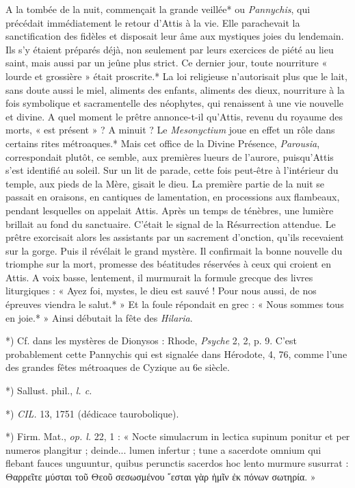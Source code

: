 \documentclass[a4paper, 11pt, oneside, polutonikogreek, french]{article}
\begin{document}
A la tombée de la nuit, commençait la grande veillée* ou \emph{Pannychis}, qui précédait immédiatement le retour d'Attis à la vie. Elle parachevait la sanctification des fidèles et disposait leur âme aux mystiques joies du lendemain. Ils s'y étaient préparés déjà, non seulement par leurs exercices de piété au lieu saint, mais aussi par un jeûne plus strict. Ce dernier jour, toute nourriture « lourde et grossière » était proscrite.* La loi religieuse n'autorisait plus que le lait, sans doute aussi le miel, aliments des enfants, aliments des dieux, nourriture à la fois symbolique et sacramentelle des néophytes, qui renaissent à une vie nouvelle et divine. A quel moment le prêtre annonce-t-il qu'Attis, revenu du royaume des morts, « est présent » ? A minuit ? Le \emph{Mesonyctium} joue en effet un rôle dans certains rites métroaques.* Mais cet office de la Divine Présence, \emph{Parousia}, correspondait plutôt, ce semble, aux premières lueurs de l'aurore, puisqu'Attis s'est identifié au soleil. Sur un lit de parade, cette fois peut-être à l'intérieur du temple, aux pieds de la Mère, gisait le dieu. La première partie de la nuit se passait en oraisons, en cantiques de lamentation, en processions aux flambeaux, pendant lesquelles on appelait Attis. Après un temps de ténèbres, une lumière brillait au fond du sanctuaire. C'était le signal de la Résurrection attendue. Le prêtre exorcisait alors les assistants par un sacrement d'onction, qu'ils recevaient sur la gorge. Puis il révélait le grand mystère. Il confirmait la bonne nouvelle du triomphe sur la mort, promesse des béatitudes réservées à ceux qui croient en Attis. A voix basse, lentement, il murmurait la formule grecque des livres liturgiques : « Ayez foi, mystes, le dieu est sauvé ! Pour nous aussi, de nos épreuves viendra le salut.* » Et la foule répondait en grec : « Nous sommes tous en joie.* » Ainsi débutait la fête des \emph{Hilaria}.

*) Cf. dans les mystères de Dionysos : Rhode, \emph{Psyche} 2, 2, p. 9. C'est probablement cette Pannychis qui est signalée dans Hérodote, 4, 76, comme l'une des grandes fêtes métroaques de Cyzique au 6e siècle.

*) Sallust. phil., \emph{l. c.}

*) \emph{CIL.} 13, 1751 (dédicace taurobolique).

*) Firm. Mat., \emph{op. l.} 22, 1 : « Nocte simulacrum in lectica supinum ponitur et per numeros plangitur ; deinde... lumen infertur ; tune a sacerdote omnium qui flebant fauces unguuntur, quibus perunctis sacerdos hoc lento murmure susurrat :  
Θαρρεῖτε μύσται τοῦ Θεοῦ σεσωσμένου  
῎εσται γὰρ ἡμῖν ἐκ πόνων σωτηρία. »
\end{document}
